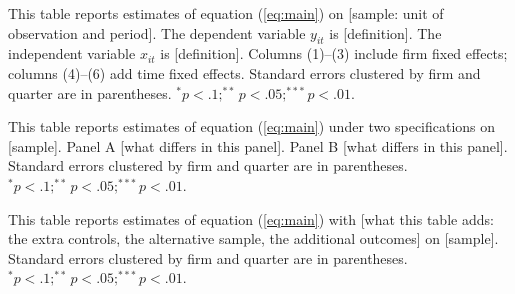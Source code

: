 

\clearpage
\begin{table}[htp!]
\caption{Main Results}
\label{tab:main}
{\footnotesize\justifying\setlength{\parindent}{0pt}
This table reports estimates of equation (\ref{eq:main}) on [sample: unit of observation and period].
The dependent variable $y_{it}$ is [definition]. The independent variable $x_{it}$ is [definition].
Columns (1)--(3) include firm fixed effects; columns (4)--(6) add time fixed effects.
Standard errors clustered by firm and quarter are in parentheses.
$^{*}p<.1; ^{**}p<.05; ^{***}p<.01$.}
\end{table}

\vspace{-1.5cm}

\begin{table}[ht!]\centering \caption*{}
    
\end{table}


\clearpage
\begin{table}[htp!]
\caption{Panel A and B Results}
\label{tab:panel}
{\footnotesize\justifying\setlength{\parindent}{0pt}
This table reports estimates of equation (\ref{eq:main}) under two specifications on [sample].
Panel A [what differs in this panel]. Panel B [what differs in this panel].
Standard errors clustered by firm and quarter are in parentheses.
$^{*}p<.1; ^{**}p<.05; ^{***}p<.01$.}
\end{table}

\begin{table}[ht!]\centering \caption*{Panel A: First Specification}
    
\end{table}

\begin{table}[ht!]\centering \caption*{Panel B: Second Specification}
    
\end{table}


\clearpage
\begin{table}[htp!]
\caption{Extended Results}
\label{tab:extended}
{\footnotesize\justifying\setlength{\parindent}{0pt}
This table reports estimates of equation (\ref{eq:main}) with [what this table adds: the extra controls, the alternative sample, the additional outcomes] on [sample].
Standard errors clustered by firm and quarter are in parentheses.
$^{*}p<.1; ^{**}p<.05; ^{***}p<.01$.}
\end{table}

\vspace{-1.5cm}

\begin{table}[ht!]\centering \caption*{}
\resizebox{\textwidth}{!}{
    
}
\end{table}
